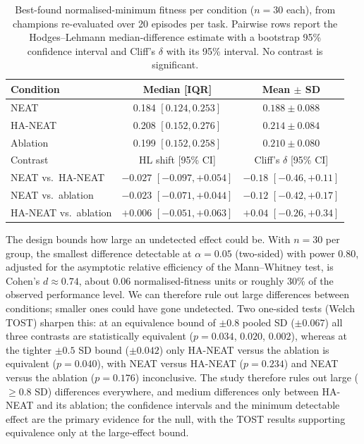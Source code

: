 \documentclass[12pt]{article}
\begin{document}
\begin{table}[h]
\centering
\caption{Best-found normalised-minimum fitness per condition ($n = 30$ each), from champions re-evaluated over 20 episodes per task. Pairwise rows report the Hodges--Lehmann median-difference estimate with a bootstrap 95\% confidence interval and Cliff's $\delta$ with its 95\% interval. No contrast is significant.}
\label{tab:main-fitness}
\begin{tabular}{lcc}
\toprule
Condition & Median [IQR] & Mean $\pm$ SD \\
\midrule
NEAT & 0.184 $[0.124, 0.253]$ & $0.188 \pm 0.088$ \\
HA-NEAT & 0.208 $[0.152, 0.276]$ & $0.214 \pm 0.084$ \\
Ablation & 0.199 $[0.152, 0.258]$ & $0.210 \pm 0.080$ \\
\midrule
Contrast & HL shift [95\% CI] & Cliff's $\delta$ [95\% CI] \\
\midrule
NEAT vs.\ HA-NEAT & $-0.027$ $[-0.097, +0.054]$ & $-0.18$ $[-0.46, +0.11]$ \\
NEAT vs.\ ablation & $-0.023$ $[-0.071, +0.044]$ & $-0.12$ $[-0.42, +0.17]$ \\
HA-NEAT vs.\ ablation & $+0.006$ $[-0.051, +0.063]$ & $+0.04$ $[-0.26, +0.34]$ \\
\bottomrule
\end{tabular}
\end{table}

The design bounds how large an undetected effect could be.
With $n = 30$ per group, the smallest difference detectable at $\alpha = 0.05$ (two-sided) with power 0.80, adjusted for the asymptotic relative efficiency of the Mann--Whitney test, is Cohen's $d \approx 0.74$, about 0.06 normalised-fitness units or roughly 30\% of the observed performance level.
We can therefore rule out large differences between conditions; smaller ones could have gone undetected.
Two one-sided tests (Welch TOST) sharpen this: at an equivalence bound of $\pm 0.8$ pooled SD ($\pm 0.067$) all three contrasts are statistically equivalent ($p = 0.034$, $0.020$, $0.002$), whereas at the tighter $\pm 0.5$ SD bound ($\pm 0.042$) only HA-NEAT versus the ablation is equivalent ($p = 0.040$), with NEAT versus HA-NEAT ($p = 0.234$) and NEAT versus the ablation ($p = 0.176$) inconclusive.
The study therefore rules out large ($\geq 0.8$ SD) differences everywhere, and medium differences only between HA-NEAT and its ablation; the confidence intervals and the minimum detectable effect are the primary evidence for the null, with the TOST results supporting equivalence only at the large-effect bound.
\end{document}
